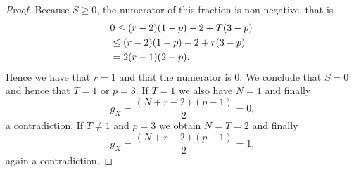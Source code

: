 \begin{proof}
    Because $S \geq 0$, the numerator of this fraction is non-negative, that is
        \begin{align*}
        \lefteqn{0 \le (r-2)(1-p) - 2 + T (3-p)}\\
        &\le  (r-2)(1-p) - 2 + r (3-p)\\
        &= 2 (r-1)(2-p).
        \end{align*}
    Hence we have that $r=1$ and that the numerator is $0$. 
    We conclude that $S=0$ and hence that $T=1$ or $p=3$. 
    If $T=1$ we also have $N=1$ and finally
        \[
        g_X = \frac{(N+r-2)(p-1)}{2} = 0,
        \]
    a contradiction.
    If $T \not=1$ and $p=3$ we obtain $N=T=2$ and finally 
        \[
        g_X = \frac{(N+r-2)(p-1)}{2} =1,
        \] 
    again a contradiction.
    \end{proof}

